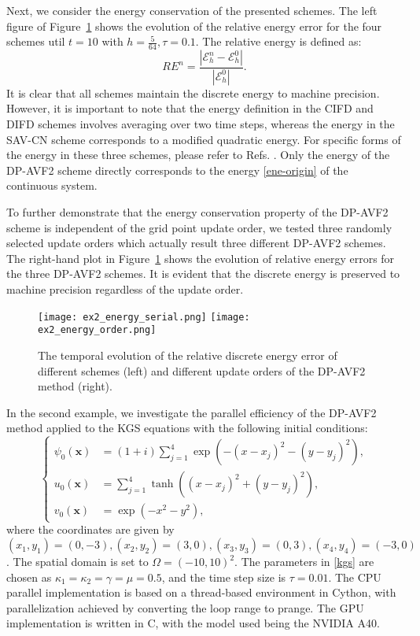 \documentclass[fleqn,11pt]{elsarticle}
\numberwithin{equation}{section}
\begin{document}
Next, we consider the energy conservation of the presented schemes. The left figure of Figure~\ref{efficiency-energy-2d} shows the evolution of the relative energy error for the four schemes util $t=10$ with $h=\frac{5}{64}, \tau=0.1$. The relative energy is defined as:
\[
RE^n = \frac{\left|\mathcal{E}_h^n - \mathcal{E}_h^0\right|}{\left|\mathcal{E}^0_h\right|}.
\]
It is clear that all schemes maintain the discrete energy to machine precision. However, it is important to note that the energy definition in the CIFD and DIFD schemes involves averaging over two time steps, whereas the energy in the SAV-CN scheme corresponds to a modified quadratic energy. For specific forms of the energy in these three schemes, please refer to Refs. \cite{kgs_cifd,kgs_difd,fkgs_sav_mcs,kgs_sav_jsc}. Only the energy of the DP-AVF2 scheme directly corresponds to the energy \eqref{ene-origin} of the continuous system.


To further demonstrate that the energy conservation property of the DP-AVF2 scheme is independent of the grid point update order, we tested three randomly selected update orders which actually result three different DP-AVF2 schemes. The right-hand plot in Figure~\ref{efficiency-energy-2d} shows the evolution of relative energy errors for the three DP-AVF2 schemes. It is evident that the discrete energy is preserved to machine precision regardless of the update order.

\begin{figure}[H]
	\centering
	\texttt{[image: ex2\_energy\_serial.png]}
	\texttt{[image: ex2\_energy\_order.png]}
	\caption{The temporal evolution of the relative discrete energy error of different schemes (left) and different update orders of the DP-AVF2 method (right).}\label{efficiency-energy-2d}
\end{figure}




In the second example, we investigate the parallel efficiency of the DP-AVF2 method applied to the KGS equations with the following initial conditions:
\[
\left\lbrace
\begin{aligned}
\psi_0(\bm{x}) & = (1 + i) \sum\limits_{j = 1}^4 \exp{\left(- (x - x_j)^2 - (y - y_j)^2\right)}, \\
u_0(\bm{x})    & = \sum\limits_{j=1}^4 \tanh{\left( (x - x_j)^2 + (y - y_j)^2 \right)}, \\
v_0(\bm{x})    & = \exp{(-x^2 - y^2)},
\end{aligned}
\right.
\]
where the coordinates are given by $(x_1, y_1) = (0, -3), (x_2, y_2) = (3, 0), (x_3, y_3) = (0, 3), (x_4, y_4) = (-3, 0)$. The spatial domain is set to $\Omega = (-10, 10)^2$. The parameters in \eqref{kgs} are chosen as $\kappa_1 = \kappa_2 = \gamma = \mu = 0.5$, and the time step size is $\tau = 0.01$. The CPU parallel implementation is based on a thread-based environment in Cython, with parallelization achieved by converting the loop range to prange. The GPU implementation is written in C, with the model used being the NVIDIA A40. 
\end{document}
